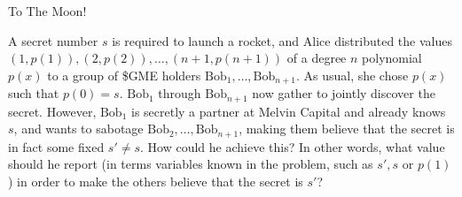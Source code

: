 \begin{homeworkProblem}{To The Moon!}

    A secret number $s$ is required to launch a rocket, and Alice distributed 
    the values $(1,p(1)), (2,p(2)), \dots, 
    (n+1,p(n+1))$ of a degree $n$ polynomial $p(x)$ to a group of 
    \$GME holders $\text{Bob}_1, \dots, \text{Bob}_{n+1}$. As usual, she chose 
    $p(x)$ such that $p(0) = s$. $\text{Bob}_1$ through $\text{Bob}_{n+1}$ now 
    gather to jointly discover the secret. However, $\text{Bob}_1$ is secretly 
    a partner at Melvin Capital and already knows $s$, and wants to sabotage 
    $\text{Bob}_2,\dots, \text{Bob}_{n+1}$, making them believe that the secret 
    is in fact some fixed $s' \neq s$. How could he achieve this? In other 
    words, what value should he report (in terms variables known in the 
    problem, such as $s', s$ or $p(1)$) in order to make the others believe 
    that the secret is $s'$?

\end{homeworkProblem}
